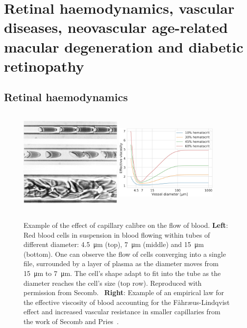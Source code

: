 \documentclass[12pt,a4paper]{journal}
\begin{document}
\section*{Retinal haemodynamics, vascular diseases, neovascular age-related macular degeneration and diabetic retinopathy}

\subsection*{Retinal haemodynamics}

\begin{figure}[t]
  \centering
  \includegraphics[width=0.45\textwidth, height=5.3cm]{cropped-RBC-in-capillaries.jpg}
  \hfill
  \includegraphics[width=0.45\textwidth, height=5.3cm]{EffectiveViscosity-Secomb.jpeg}
  \caption{Example of the effect of capillary calibre on the flow of blood. \textbf{Left}: Red blood cells in suspension in blood flowing within tubes of different diameter: \SI{4.5}{\micro\meter} (top), \SI{7}{\micro\meter} (middle) and \SI{15}{\micro\meter} (bottom). One can observe the flow of cells converging into a single file, surrounded by a layer of plasma as the diameter moves from \SI{15}{\micro\meter} to \SI{7}{\micro\meter}. The cell's shape adapt to fit into the tube as the diameter reaches the cell's size (top row). Reproduced with permission from Secomb.~\cite{Secomb_2003} \textbf{Right}: Example of an empirical law for the effective viscosity of blood accounting for the F\r{a}hr\ae us-Lindqvist effect and increased vascular resistance in smaller capillaries from the work of Secomb and Pries~\cite{Secomb_2013}.}
  \label{fig:effectiveViscosity}
\end{figure}
\end{document}
